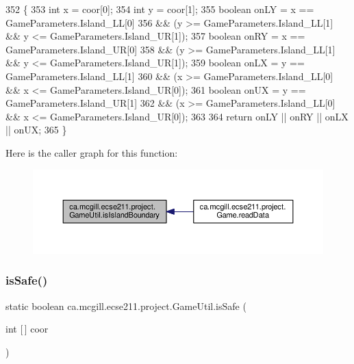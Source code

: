 \begin{DoxyCode}
352                                                      \{
353     \textcolor{keywordtype}{int} x = coor[0];
354     \textcolor{keywordtype}{int} y = coor[1];
355     \textcolor{keywordtype}{boolean} onLY = x == GameParameters.Island\_LL[0]
356         && (y >= GameParameters.Island\_LL[1] && y <= GameParameters.Island\_UR[1]);
357     \textcolor{keywordtype}{boolean} onRY = x == GameParameters.Island\_UR[0]
358         && (y >= GameParameters.Island\_LL[1] && y <= GameParameters.Island\_UR[1]);
359     \textcolor{keywordtype}{boolean} onLX = y == GameParameters.Island\_LL[1]
360         && (x >= GameParameters.Island\_LL[0] && x <= GameParameters.Island\_UR[0]);
361     \textcolor{keywordtype}{boolean} onUX = y == GameParameters.Island\_UR[1]
362         && (x >= GameParameters.Island\_LL[0] && x <= GameParameters.Island\_UR[0]);
363 
364     \textcolor{keywordflow}{return} onLY || onRY || onLX || onUX;
365   \}
\end{DoxyCode}
Here is the caller graph for this function\+:\nopagebreak
\begin{figure}[H]
\begin{center}
\leavevmode
\includegraphics[width=350pt]{classca_1_1mcgill_1_1ecse211_1_1project_1_1_game_util_a5783c3415e13b66362a647504b63741a_icgraph}
\end{center}
\end{figure}
\mbox{\label{classca_1_1mcgill_1_1ecse211_1_1project_1_1_game_util_a4b657445545fb1a814b6699724d72042}} 
\subsubsection{\texorpdfstring{is\+Safe()}{isSafe()}}
{\footnotesize\ttfamily static boolean ca.\+mcgill.\+ecse211.\+project.\+Game\+Util.\+is\+Safe (\begin{DoxyParamCaption}\item[{int \mbox{[}$\,$\mbox{]}}]{coor }\end{DoxyParamCaption})\hspace{0.3cm}{\ttfamily [static]}}

